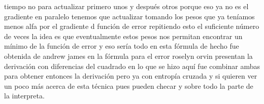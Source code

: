 tiempo no para actualizar primero unos y después otros porque eso ya no es el gradiente en paralelo tenemos que actualizar tomando los pesos que ya teníamos menos alfa por el gradiente d función de error repitiendo esto el suficiente número de veces la idea es que eventualmente estos pesos nos permitan encontrar un mínimo de la función de error y eso sería todo en esta fórmula de hecho fue obtenida de andrew james en la fórmula para el error roselyn orvin presentan la derivación con diferencias del cuadrado en lo que se hizo aquí fue combinar ambas para obtener entonces la derivación pero ya con entropía cruzada y si quieren ver un poco más acerca de esta técnica pues pueden checar y sobre todo la parte de la interpreta.
